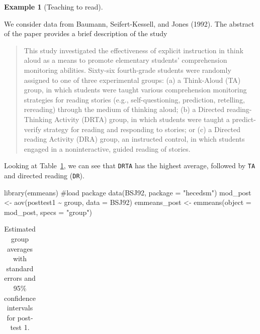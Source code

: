 \documentclass[
  11pt,
  letterpaper,
]{scrbook}
\newenvironment{Shaded}{\begin{snugshade}}{\end{snugshade}}
\newcommand{\AttributeTok}[1]{\textcolor[rgb]{0.40,0.45,0.13}{#1}}
\newcommand{\CommentTok}[1]{\textcolor[rgb]{0.37,0.37,0.37}{#1}}
\newcommand{\FunctionTok}[1]{\textcolor[rgb]{0.28,0.35,0.67}{#1}}
\newcommand{\NormalTok}[1]{\textcolor[rgb]{0.00,0.23,0.31}{#1}}
\newcommand{\OtherTok}[1]{\textcolor[rgb]{0.00,0.23,0.31}{#1}}
\newcommand{\SpecialCharTok}[1]{\textcolor[rgb]{0.37,0.37,0.37}{#1}}
\newcommand{\StringTok}[1]{\textcolor[rgb]{0.13,0.47,0.30}{#1}}
\theoremstyle{definition}
\newtheorem{example}{Example}[chapter]
\theoremstyle{definition}
\theoremstyle{remark}
\begin{document}
\begin{example}[Teaching to
read]\protect\hypertarget{exm-teachingtoread}{}\label{exm-teachingtoread}

We consider data from Baumann, Seifert-Kessell, and Jones (1992). The
abstract of the paper provides a brief description of the study

\begin{quote}
This study investigated the effectiveness of explicit instruction in
think aloud as a means to promote elementary students' comprehension
monitoring abilities. Sixty-six fourth-grade students were randomly
assigned to one of three experimental groups: (a) a Think-Aloud (TA)
group, in which students were taught various comprehension monitoring
strategies for reading stories (e.g., self-questioning, prediction,
retelling, rereading) through the medium of thinking aloud; (b) a
Directed reading-Thinking Activity (DRTA) group, in which students were
taught a predict-verify strategy for reading and responding to stories;
or (c) a Directed reading Activity (DRA) group, an instructed control,
in which students engaged in a noninteractive, guided reading of
stories.
\end{quote}

Looking at Table~\ref{tbl-print-pairwise-baumann}, we can see that
\texttt{DRTA} has the highest average, followed by \texttt{TA} and
directed reading (\texttt{DR}).

\begin{Shaded}
\begin{Highlighting}[]
\FunctionTok{library}\NormalTok{(emmeans) }\CommentTok{\#load package}
\FunctionTok{data}\NormalTok{(BSJ92, }\AttributeTok{package =} \StringTok{"hecedsm"}\NormalTok{)}
\NormalTok{mod\_post }\OtherTok{\textless{}{-}} \FunctionTok{aov}\NormalTok{(posttest1 }\SpecialCharTok{\textasciitilde{}}\NormalTok{ group, }\AttributeTok{data =}\NormalTok{ BSJ92)}
\NormalTok{emmeans\_post }\OtherTok{\textless{}{-}} \FunctionTok{emmeans}\NormalTok{(}\AttributeTok{object =}\NormalTok{ mod\_post, }
                        \AttributeTok{specs =} \StringTok{"group"}\NormalTok{)}
\end{Highlighting}
\end{Shaded}

\begin{longtable}[t]{lrrrrr}

\caption{\label{tbl-print-pairwise-baumann}Estimated group averages with
standard errors and 95\% confidence intervals for post-test 1.}


\end{longtable}
\end{example}
\end{document}
